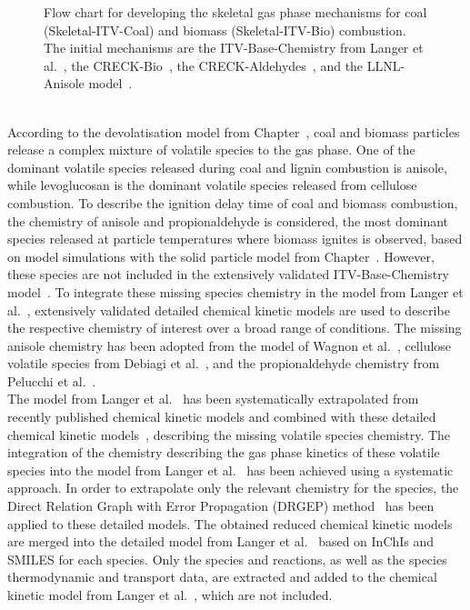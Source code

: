 \begin{refsection}
\begin{figure}[h]
  \centering
  \caption{Flow chart for developing the skeletal gas phase mechanisms for coal (Skeletal-ITV-Coal) and biomass (Skeletal-ITV-Bio) combustion. The initial mechanisms are the ITV-Base-Chemistry from Langer et al.~\cite{Langer2023}, the CRECK-Bio~\cite{Debiagi2016}, the CRECK-Aldehydes~\cite{Pelucchi2015}, and the LLNL-Anisole model~\cite{Wagnon2018}.}
  \label{fig:B1bKineticModelDevelopmentStructure}
\end{figure}
\\
According to the devolatisation model from Chapter~, coal and biomass particles release a complex mixture of volatile species to the gas phase. One of the dominant volatile species released during coal and lignin combustion is anisole, while levoglucosan is the dominant volatile species released from cellulose combustion. To describe the ignition delay time of coal and biomass combustion, the chemistry of anisole and propionaldehyde is considered, the most dominant species released at particle temperatures where biomass ignites is observed, based on model simulations with the solid particle model from Chapter~. However, these species are not included in the extensively validated ITV-Base-Chemistry model~\cite{Langer2023}. To integrate these missing species chemistry in the model from Langer et al.~\cite{Langer2023}, extensively validated detailed chemical kinetic models are used to describe the respective chemistry of interest over a broad range of conditions. The missing anisole chemistry has been adopted from the model of Wagnon et al.~\cite{Wagnon2018}, cellulose volatile species from Debiagi et al.~\cite{Debiagi2016}, and the propionaldehyde chemistry from Pelucchi et al.~\cite{Pelucchi2015}.
\\
The model from Langer et al.~\cite{Langer2023} has been systematically extrapolated from recently published chemical kinetic models and combined with these detailed chemical kinetic models~\cite{Wagnon2018, Debiagi2016, Pelucchi2015}, describing the missing volatile species chemistry. The integration of the chemistry describing the gas phase kinetics of these volatile species into the model from Langer et al.~\cite{Langer2023} has been achieved using a systematic approach. In order to extrapolate only the relevant chemistry for the species, the Direct Relation Graph with Error Propagation (DRGEP) method~\cite{PepiotDesjardins2008a} has been applied to these detailed models. The obtained reduced chemical kinetic models are merged into the detailed model from Langer et al.~\cite{Langer2023} based on InChIs and SMILES for each species. Only the species and reactions, as well as the species thermodynamic and transport data, are extracted and added to the chemical kinetic model from Langer et al.~\cite{Langer2023}, which are not included.

\end{refsection}

